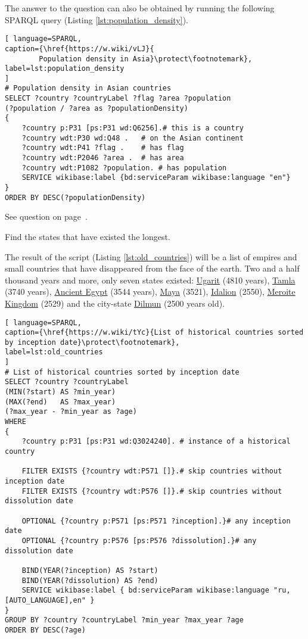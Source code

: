 The answer to the question can also be obtained by running the following SPARQL query (Listing \ref{lst:population_density}).

\begin{lstlisting}[ language=SPARQL, 
caption={\href{https://w.wiki/vLJ}{
		Population density in Asia}\protect\footnotemark},
label=lst:population_density
]
# Population density in Asian countries
SELECT ?country ?countryLabel ?flag ?area ?population 
(?population / ?area as ?populationDensity)
{
	?country p:P31 [ps:P31 wd:Q6256].# this is a country
	?country wdt:P30 wd:Q48 .   # on the Asian continent 
	?country wdt:P41 ?flag .    # has flag
	?country wdt:P2046 ?area .  # has area
	?country wdt:P1082 ?population. # has population  
	SERVICE wikibase:label {bd:serviceParam wikibase:language "en"}
}
ORDER BY DESC(?populationDensity)
\end{lstlisting}

See question on page~\pageref{question:population_density}.
\begin{exercise}
\label{answer:old_countries}

Find the states that have existed the longest.

\end{exercise}

The result of the script (Listing \ref{lst:old_countries}) will be a list of empires and small countries that have disappeared from the face of the earth. Two and a half thousand years and more, only seven states existed: \href{https://w.wiki/vAT}{Ugarit} (4810 years), \href{https://w.wiki/vAU}{Tamla} (3740 years), \href{https://w.wiki/vAX}{Ancient Egypt} (3544 years), \href{https://w.wiki/vAY}{Maya} (3521), \href{ https://w.wiki/vAZ}{Idalion} (2550), \href{https://w.wiki/vAb}{Meroite Kingdom} (2529) and the city-state \href{https://w.wiki/vAf}{Dilmun} (2500 years old).

\begin{lstlisting}[ language=SPARQL, 
caption={\href{https://w.wiki/tYc}{List of historical countries sorted by inception date}\protect\footnotemark},
label=lst:old_countries
]
# List of historical countries sorted by inception date
SELECT ?country ?countryLabel 
(MIN(?start) AS ?min_year)
(MAX(?end)   AS ?max_year) 
(?max_year - ?min_year as ?age)
WHERE
{
	?country p:P31 [ps:P31 wd:Q3024240]. # instance of a historical country
	
	FILTER EXISTS {?country wdt:P571 []}.# skip countries without inception date
	FILTER EXISTS {?country wdt:P576 []}.# skip countries without dissolution date
	
	OPTIONAL {?country p:P571 [ps:P571 ?inception].}# any inception date
	OPTIONAL {?country p:P576 [ps:P576 ?dissolution].}# any dissolution date
	
	BIND(YEAR(?inception) AS ?start)
	BIND(YEAR(?dissolution) AS ?end)  
	SERVICE wikibase:label { bd:serviceParam wikibase:language "ru,[AUTO_LANGUAGE],en" }
}
GROUP BY ?country ?countryLabel ?min_year ?max_year ?age
ORDER BY DESC(?age)
\end{lstlisting}

